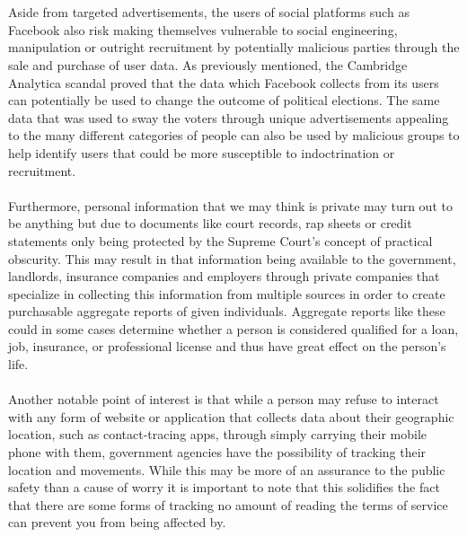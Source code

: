 \documentclass[11pt]{article}
\begin{document}
\\ \\
Aside from targeted advertisements, the users of social platforms such as Facebook also risk making themselves vulnerable to social engineering, manipulation or outright recruitment by potentially malicious parties through the sale and purchase of user data. As previously mentioned, the Cambridge Analytica scandal proved that the data which Facebook collects from its users can potentially be used to change the outcome of political elections. The same data that was used to sway the voters through unique advertisements appealing to the many different categories of people can also be used by malicious groups to help identify users that could be more susceptible to indoctrination or recruitment. 
\\ \\
Furthermore, personal information that we may think is private may turn out to be anything but due to documents like court records, rap sheets or credit statements only being protected by the Supreme Court's concept of practical obscurity. This may result in that information being available to the government, landlords, insurance companies and employers through private companies that specialize in collecting this information from multiple sources in order to create purchasable aggregate reports of given individuals. Aggregate reports like these could in some cases determine whether a person is considered qualified for a loan, job, insurance, or professional license and thus have great effect on the person’s life.
\\ \\
Another notable point of interest is that while a person may refuse to interact with any form of website or application that collects data about their geographic location, such as contact-tracing apps, through simply carrying their mobile phone with them, government agencies have the possibility of tracking their location and movements. While this may be more of an assurance to the public safety than a cause of worry it is important to note that this solidifies the fact that there are some forms of tracking no amount of reading the terms of service can prevent you from being affected by.
\\ \\
\end{document}
